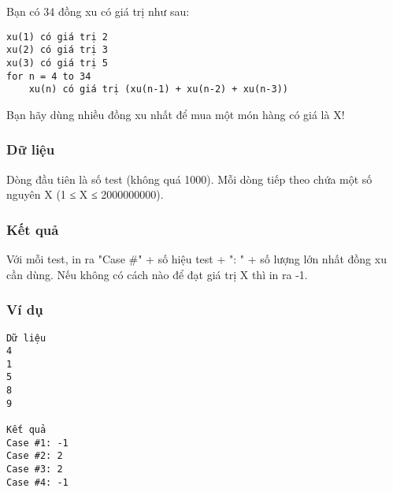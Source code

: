 



   Bạn có 34 đồng xu có giá trị như sau:  
\begin{verbatim}
xu(1) có giá trị 2
xu(2) có giá trị 3
xu(3) có giá trị 5
for n = 4 to 34
    xu(n) có giá trị (xu(n-1) + xu(n-2) + xu(n-3))
\end{verbatim}

   Bạn hãy dùng nhiều đồng xu nhất để mua một món hàng có giá là X!  

\subsubsection{   Dữ liệu  }

   Dòng đầu tiên là số test (không quá 1000). Mỗi dòng tiếp theo chứa một số nguyên X (1 ≤ X ≤ 2000000000).  

\subsubsection{   Kết quả  }

   Với mỗi test, in ra "Case \#" + số hiệu test + ": " + số lượng lớn nhất đồng xu cần dùng. Nếu không có cách nào để đạt giá trị X thì in ra -1.  

\subsubsection{   Ví dụ  }
\begin{verbatim}
Dữ liệu
4
1
5
8
9

Kết quả
Case #1: -1
Case #2: 2
Case #3: 2
Case #4: -1
\end{verbatim}